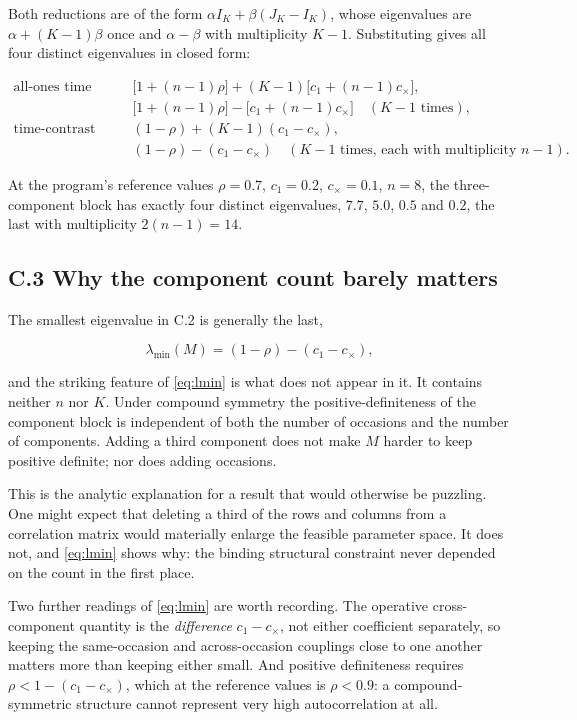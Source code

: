 \documentclass[
  11pt,
]{article}
\begin{document}
Both reductions are of the form \(\alpha I_K + \beta (J_K - I_K)\),
whose eigenvalues are \(\alpha + (K-1)\beta\) once and \(\alpha - \beta\)
with multiplicity \(K-1\). Substituting gives all four distinct
eigenvalues in closed form:

\[
\begin{aligned}
\text{all-ones time direction:}\quad
&\bigl[1 + (n-1)\rho\bigr] + (K-1)\bigl[c_1 + (n-1)c_{\times}\bigr],\\
&\bigl[1 + (n-1)\rho\bigr] - \bigl[c_1 + (n-1)c_{\times}\bigr]
  \quad (K-1 \text{ times}),\\[4pt]
\text{time-contrast directions:}\quad
&(1-\rho) + (K-1)(c_1 - c_{\times}),\\
&(1-\rho) - (c_1 - c_{\times})
  \quad (K-1 \text{ times, each with multiplicity } n-1).
\end{aligned}
\]

At the program's reference values \(\rho = 0.7\), \(c_1 = 0.2\),
\(c_{\times} = 0.1\), \(n = 8\), the three-component block has exactly
four distinct eigenvalues, \(7.7\), \(5.0\), \(0.5\) and \(0.2\), the last
with multiplicity \(2(n-1) = 14\).

\subsection{C.3 Why the component count barely matters}

The smallest eigenvalue in C.2 is generally the last,

\begin{equation}
\lambda_{\min}(M) = (1-\rho) - (c_1 - c_{\times}),
\label{eq:lmin}
\end{equation}

and the striking feature of \eqref{eq:lmin} is what does not appear
in it. It contains neither \(n\) nor \(K\). Under compound symmetry the
positive-definiteness of the component block is independent of both
the number of occasions and the number of components. Adding a third
component does not make \(M\) harder to keep positive definite; nor
does adding occasions.

This is the analytic explanation for a result that would otherwise be
puzzling. One might expect that deleting a third of the rows and
columns from a correlation matrix would materially enlarge the
feasible parameter space. It does not, and \eqref{eq:lmin} shows why:
the binding structural constraint never depended on the count in the
first place.

Two further readings of \eqref{eq:lmin} are worth recording. The
operative cross-component quantity is the \emph{difference}
\(c_1 - c_{\times}\), not either coefficient separately, so keeping the
same-occasion and across-occasion couplings close to one another
matters more than keeping either small. And positive definiteness
requires \(\rho < 1 - (c_1 - c_{\times})\), which at the reference
values is \(\rho < 0.9\): a compound-symmetric structure cannot
represent very high autocorrelation at all.
\end{document}
